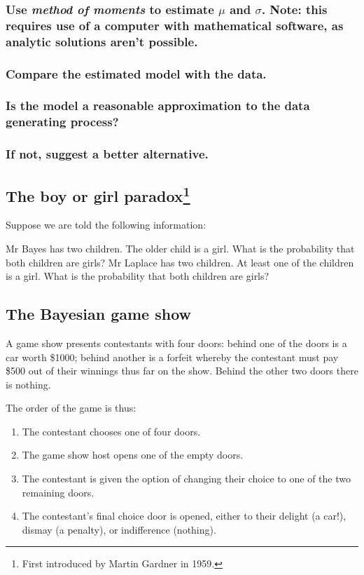 \documentclass[11pt,fullpage]{book}
\begin{document}
\subsubsection{Use \textit{method of moments} to estimate $\mu$ and $\sigma$. Note: this requires use of a computer with mathematical software, as analytic solutions aren't possible.}

\subsubsection{Compare the estimated model with the data.}
\subsubsection{Is the model a reasonable approximation to the data generating process?}
\subsubsection{If not, suggest a better alternative.}

\subsection{The boy or girl paradox\footnote{First introduced by Martin Gardner in 1959.}}
Suppose we are told the following information:

Mr Bayes has two children. The older child is a girl. What is the probability that both children are girls?
Mr Laplace has two children. At least one of the children is a girl. What is the probability that both children are girls?

\subsection{The Bayesian game show}
A game show presents contestants with four doors: behind one of the doors is a car worth \$1000; behind another is a forfeit whereby the contestant must pay \$500 out of their winnings thus far on the show. Behind the other two doors there is nothing.

The order of the game is thus:
\begin{enumerate}
\item The contestant chooses one of four doors.
\item The game show host opens one of the empty doors.
\item The contestant is given the option of changing their choice to one of the two remaining doors.
\item The contestant's final choice door is opened, either to their delight (a car!), dismay (a penalty), or indifference (nothing).
\end{enumerate}
\end{document}
